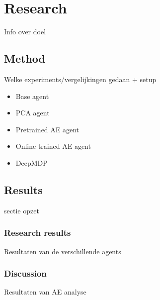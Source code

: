 \chapter{Research}\label{research}
Info over doel
\section{Method}\label{research-method}
Welke experiments/vergelijkingen gedaan + setup

\begin{itemize}
\item Base agent
\item PCA agent
\item Pretrained AE agent
\item Online trained AE agent
\item DeepMDP
\end{itemize}

\section{Results}\label{research-results}
sectie opzet
\subsection{Research results}
Resultaten van de verschillende agents

\subsection{Discussion}
Resultaten van AE analyse




